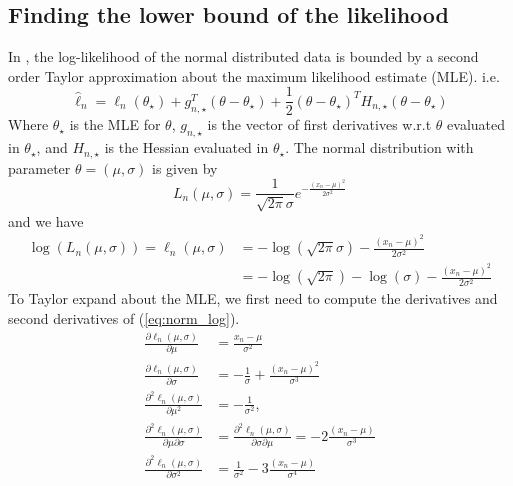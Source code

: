 \documentclass{article}
\theoremstyle{definition}
\begin{document}
\subsection{Finding the lower bound of the likelihood}
In \cite{Bardenet:1}, the log-likelihood of the normal distributed data is bounded by a second order Taylor approximation about the maximum likelihood estimate (MLE). i.e. 
\begin{equation}
  \hat{\ell}_n = \ell_n(\theta_{\star} ) + g_{n,\star}^T\left(\theta - \theta_{\star}\right) + \frac{1}{2}\left(\theta - \theta_{\star}\right)^T H_{n, \star}\left(\theta - \theta_{\star}\right)
\end{equation}
Where $\theta_{\star}$ is the MLE for $\theta$, $g_{n,\star}$ is the vector of first derivatives w.r.t $\theta$ evaluated in $\theta_{\star}$, and $H_{n, \star}$ is the Hessian evaluated in $\theta_{\star}$. The normal distribution with parameter $\theta = (\mu, \sigma)$  is given by 
\begin{equation}
    L_n(\mu, \sigma) = \frac{1}{\sqrt{2\pi}\sigma}e^{-\frac{\left(x_n-\mu\right)^2}{2\sigma^2}}
\end{equation}
and we have 
\begin{equation}\label{eq:norm_log}
\begin{split}
    \log\left(L_n(\mu, \sigma)\right) = \ell_n(\mu, \sigma) &= -\log\left(\sqrt{2\pi}\sigma\right) - \frac{\left(x_n - \mu\right)^2}{2\sigma^2} \\
    &= - \log\left(\sqrt{2\pi}\right) - \log\left(\sigma\right) - \frac{\left(x_n-\mu\right)^2}{2\sigma^2}
\end{split}
\end{equation}
To Taylor expand about the MLE, we first need to compute the derivatives and second derivatives of (\ref{eq:norm_log}). 
\begin{equation}
    \begin{split}
    \frac{\partial \ell_n\left(\mu, \sigma\right)}{\partial \mu} &= \frac{x_n - \mu}{\sigma^2} 
    \\ \frac{\partial \ell_n\left(\mu, \sigma\right)}{\partial \sigma} &= -\frac{1}{\sigma}  + \frac{\left(x_n - \mu \right)^2}{\sigma^3}\\
    \frac{\partial^2\ell_n(\mu, \sigma)}{\partial \mu ^2} &= -\frac{1}{\sigma^2}, \\ 
    \frac{\partial^2 \ell_n(\mu, \sigma)}{\partial\mu\partial \sigma} &=  \frac{\partial^2 \ell_n(\mu, \sigma)}{\partial \sigma \partial \mu} = -2\frac{(x_n - \mu)}{\sigma^3} \\  \frac{\partial^2 \ell_n(\mu, \sigma)}{\partial \sigma^2} &= \frac{1}{\sigma^2} - 3\frac{(x_n - \mu)}{\sigma^4}
\end{split}
\end{equation}
\end{document}
